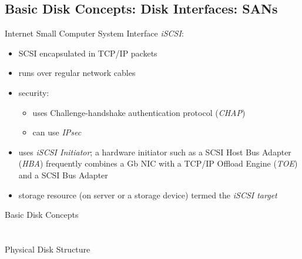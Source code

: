\documentclass[xga]{xdvislides}
\begin{document}
\subsection{Basic Disk Concepts: Disk Interfaces: SANs}
Internet Small Computer System Interface {\em iSCSI}:
\begin{itemize}
	\item SCSI encapsulated in TCP/IP packets
	\item runs over regular network cables
	\item security:
		\begin{itemize}
			\item uses Challenge-handshake authentication protocol ({\em CHAP})
			\item can use {\em IPsec}
		\end{itemize}
	\item uses {\em iSCSI Initiator}; a hardware initiator such as a SCSI
		Host Bus Adapter ({\em HBA}) frequently combines a Gb NIC
		with a TCP/IP Offload Engine ({\em TOE}) and a SCSI Bus
		Adapter
	\item storage resource (on server or a storage device) termed the
		{\em iSCSI target}
\end{itemize}

\newpage

\vspace*{\fill}
\begin{center}
	\Hugesize
		Basic Disk Concepts\\ [1em]
	\hspace*{5mm}
	\blueline\\
	\hspace*{5mm}\\
		Physical Disk Structure
\end{center}
\vspace*{\fill}
\end{document}
